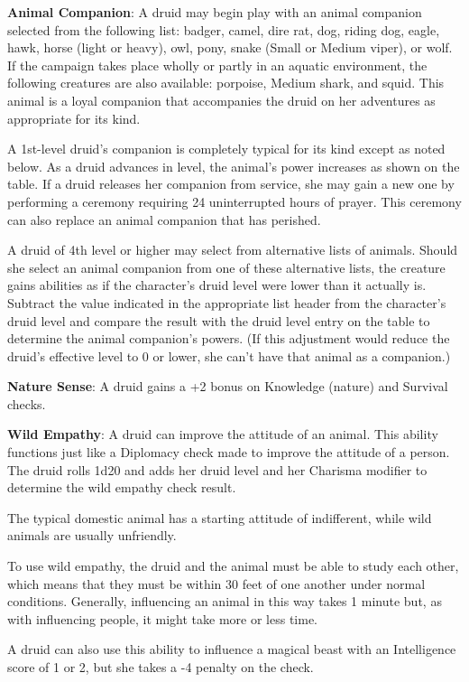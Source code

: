 \textbf{Animal Companion}: A druid may begin play with an animal companion selected from the following list: badger, camel, dire rat, dog, riding dog, eagle, hawk, horse (light or heavy), owl, pony, snake (Small or Medium viper), or wolf. If the campaign takes place wholly or partly in an aquatic environment, the following creatures are also available: porpoise, Medium shark, and squid. This animal is a loyal companion that accompanies the druid on her adventures as appropriate for its kind.

A 1st-level druid’s companion is completely typical for its kind except as noted below. As a druid advances in level, the animal’s power increases as shown on the table. If a druid releases her companion from service, she may gain a new one by performing a ceremony requiring 24 uninterrupted hours of prayer. This ceremony can also replace an animal companion that has perished.

A druid of 4th level or higher may select from alternative lists of animals. Should she select an animal companion from one of these alternative lists, the creature gains abilities as if the character’s druid level were lower than it actually is. Subtract the value indicated in the appropriate list header from the character’s druid level and compare the result with the druid level entry on the table to determine the animal companion’s powers. (If this adjustment would reduce the druid’s effective level to 0 or lower, she can’t have that animal as a companion.)

\textbf{Nature Sense}: A druid gains a +2 bonus on Knowledge (nature) and Survival checks.

\textbf{Wild Empathy}: A druid can improve the attitude of an animal. This ability functions just like a Diplomacy check made to improve the attitude of a person. The druid rolls 1d20 and adds her druid level and her Charisma modifier to determine the wild empathy check result.

The typical domestic animal has a starting attitude of indifferent, while wild animals are usually unfriendly.

To use wild empathy, the druid and the animal must be able to study each other, which means that they must be within 30 feet of one another under normal conditions. Generally, influencing an animal in this way takes 1 minute but, as with influencing people, it might take more or less time.

A druid can also use this ability to influence a magical beast with an Intelligence score of 1 or 2, but she takes a -4 penalty on the check.

